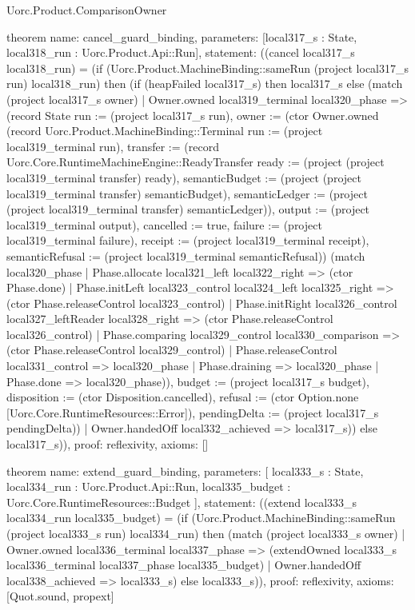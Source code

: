 \begin{lexlean}{Uorc.Product.ComparisonOwner}
\begin{semanticmodule}
theorem{
  name: cancel_guard_binding,
  parameters: [local317_s : State, local318_run : Uorc.Product.Api::Run],
  statement: ((cancel local317_s local318_run) = (if (Uorc.Product.MachineBinding::sameRun (project local317_s run) local318_run) then (if (heapFailed local317_s) then local317_s else (match (project local317_s owner)
    | Owner.owned local319_terminal local320_phase => (record State {run := (project local317_s run), owner := (ctor Owner.owned (record Uorc.Product.MachineBinding::Terminal {run := (project local319_terminal run), transfer := (record Uorc.Core.RuntimeMachineEngine::ReadyTransfer {ready := (project (project local319_terminal transfer) ready), semanticBudget := (project (project local319_terminal transfer) semanticBudget), semanticLedger := (project (project local319_terminal transfer) semanticLedger)}), output := (project local319_terminal output), cancelled := true, failure := (project local319_terminal failure), receipt := (project local319_terminal receipt), semanticRefusal := (project local319_terminal semanticRefusal)}) (match local320_phase
      | Phase.allocate local321_left local322_right => (ctor Phase.done)
      | Phase.initLeft local323_control local324_left local325_right => (ctor Phase.releaseControl local323_control)
      | Phase.initRight local326_control local327_leftReader local328_right => (ctor Phase.releaseControl local326_control)
      | Phase.comparing local329_control local330_comparison => (ctor Phase.releaseControl local329_control)
      | Phase.releaseControl local331_control => local320_phase
      | Phase.draining => local320_phase
      | Phase.done => local320_phase)), budget := (project local317_s budget), disposition := (ctor Disposition.cancelled), refusal := (ctor Option.none [Uorc.Core.RuntimeResources::Error]), pendingDelta := (project local317_s pendingDelta)})
    | Owner.handedOff local332_achieved => local317_s)) else local317_s)),
  proof: reflexivity{},
  axioms: []
}

theorem{
  name: extend_guard_binding,
  parameters: [
    local333_s : State,
    local334_run : Uorc.Product.Api::Run,
    local335_budget : Uorc.Core.RuntimeResources::Budget
  ],
  statement: ((extend local333_s local334_run local335_budget) = (if (Uorc.Product.MachineBinding::sameRun (project local333_s run) local334_run) then (match (project local333_s owner)
    | Owner.owned local336_terminal local337_phase => (extendOwned local333_s local336_terminal local337_phase local335_budget)
    | Owner.handedOff local338_achieved => local333_s) else local333_s)),
  proof: reflexivity{},
  axioms: [Quot.sound, propext]
}


\end{semanticmodule}
\end{lexlean}
